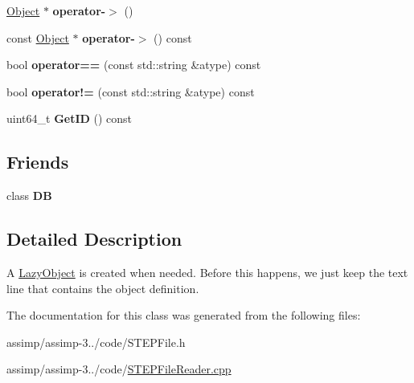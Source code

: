 \begin{DoxyCompactItemize}
\item 
\hypertarget{class_assimp_1_1_s_t_e_p_1_1_lazy_object_afcef3a4a58bb00f714306d11482f3c02}{\hyperlink{class_assimp_1_1_s_t_e_p_1_1_object}{Object} $\ast$ {\bfseries operator-\/$>$} ()}\label{class_assimp_1_1_s_t_e_p_1_1_lazy_object_afcef3a4a58bb00f714306d11482f3c02}

\item 
\hypertarget{class_assimp_1_1_s_t_e_p_1_1_lazy_object_a5009d4a493c3792871ecec35f8fb424d}{const \hyperlink{class_assimp_1_1_s_t_e_p_1_1_object}{Object} $\ast$ {\bfseries operator-\/$>$} () const }\label{class_assimp_1_1_s_t_e_p_1_1_lazy_object_a5009d4a493c3792871ecec35f8fb424d}

\item 
\hypertarget{class_assimp_1_1_s_t_e_p_1_1_lazy_object_aba029b6ee768d7e103d8a376b668ebb7}{bool {\bfseries operator==} (const std\+::string \&atype) const }\label{class_assimp_1_1_s_t_e_p_1_1_lazy_object_aba029b6ee768d7e103d8a376b668ebb7}

\item 
\hypertarget{class_assimp_1_1_s_t_e_p_1_1_lazy_object_a55926b36ca7790e35d6b16d2eb2a1487}{bool {\bfseries operator!=} (const std\+::string \&atype) const }\label{class_assimp_1_1_s_t_e_p_1_1_lazy_object_a55926b36ca7790e35d6b16d2eb2a1487}

\item 
\hypertarget{class_assimp_1_1_s_t_e_p_1_1_lazy_object_a61097587d46e06fd914e46c6d84909d4}{uint64\+\_\+t {\bfseries Get\+I\+D} () const }\label{class_assimp_1_1_s_t_e_p_1_1_lazy_object_a61097587d46e06fd914e46c6d84909d4}

\end{DoxyCompactItemize}
\subsection*{Friends}
\begin{DoxyCompactItemize}
\item 
\hypertarget{class_assimp_1_1_s_t_e_p_1_1_lazy_object_ad22eb7a23cbf34de526efa966c578d4a}{class {\bfseries D\+B}}\label{class_assimp_1_1_s_t_e_p_1_1_lazy_object_ad22eb7a23cbf34de526efa966c578d4a}

\end{DoxyCompactItemize}


\subsection{Detailed Description}
A \hyperlink{class_assimp_1_1_s_t_e_p_1_1_lazy_object}{Lazy\+Object} is created when needed. Before this happens, we just keep the text line that contains the object definition. 

The documentation for this class was generated from the following files\+:\begin{DoxyCompactItemize}
\item 
assimp/assimp-\/3../code/S\+T\+E\+P\+File.\+h\item 
assimp/assimp-\/3../code/\hyperlink{_s_t_e_p_file_reader_8cpp}{S\+T\+E\+P\+File\+Reader.\+cpp}\end{DoxyCompactItemize}
